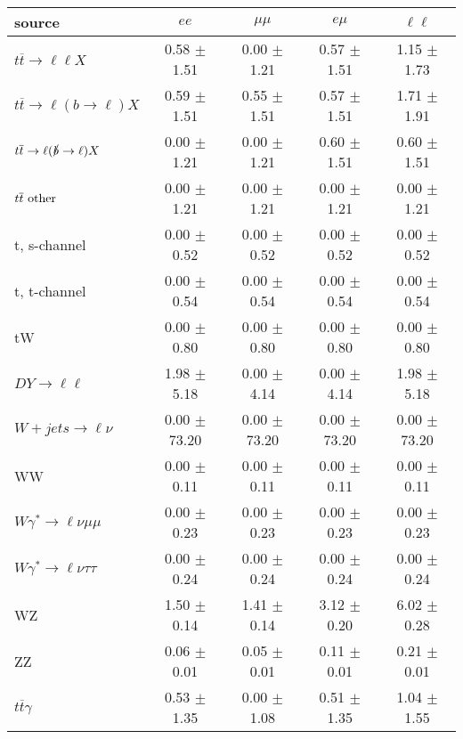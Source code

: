 \begin{tabular}{l|cccc} \hline\hline
source & $ee$ & $\mu\mu$ & $e\mu$ & $\ell\ell $ \\
\hline
$t\overline{t} \rightarrow \ell \ell X$ &  0.58 $\pm$  1.51 &  0.00 $\pm$  1.21 &  0.57 $\pm$  1.51 &  1.15 $\pm$  1.73 \\
$t\overline{t} \rightarrow \ell (b \rightarrow \ell) X$ &  0.59 $\pm$  1.51 &  0.55 $\pm$  1.51 &  0.57 $\pm$  1.51 &  1.71 $\pm$  1.91 \\
$t\overline{t} \rightarrow \ell (\slashed b \rightarrow \ell) X$ &  0.00 $\pm$  1.21 &  0.00 $\pm$  1.21 &  0.60 $\pm$  1.51 &  0.60 $\pm$  1.51 \\
        $t\overline{t}\ \rm{other}$ &  0.00 $\pm$  1.21 &  0.00 $\pm$  1.21 &  0.00 $\pm$  1.21 &  0.00 $\pm$  1.21 \\
\hline
                       t, s-channel &  0.00 $\pm$  0.52 &  0.00 $\pm$  0.52 &  0.00 $\pm$  0.52 &  0.00 $\pm$  0.52 \\
                       t, t-channel &  0.00 $\pm$  0.54 &  0.00 $\pm$  0.54 &  0.00 $\pm$  0.54 &  0.00 $\pm$  0.54 \\
                                 tW &  0.00 $\pm$  0.80 &  0.00 $\pm$  0.80 &  0.00 $\pm$  0.80 &  0.00 $\pm$  0.80 \\
\hline
         $DY \rightarrow \ell \ell$ &  1.98 $\pm$  5.18 &  0.00 $\pm$  4.14 &  0.00 $\pm$  4.14 &  1.98 $\pm$  5.18 \\
      $W+jets \rightarrow \ell \nu$ &  0.00 $\pm$ 73.20 &  0.00 $\pm$ 73.20 &  0.00 $\pm$ 73.20 &  0.00 $\pm$ 73.20 \\
                                 WW &  0.00 $\pm$  0.11 &  0.00 $\pm$  0.11 &  0.00 $\pm$  0.11 &  0.00 $\pm$  0.11 \\
\hline
$W\gamma^{*} \rightarrow \ell \nu \mu\mu$ &  0.00 $\pm$  0.23 &  0.00 $\pm$  0.23 &  0.00 $\pm$  0.23 &  0.00 $\pm$  0.23 \\
$W\gamma^{*} \rightarrow \ell \nu \tau\tau$ &  0.00 $\pm$  0.24 &  0.00 $\pm$  0.24 &  0.00 $\pm$  0.24 &  0.00 $\pm$  0.24 \\
                                 WZ &  1.50 $\pm$  0.14 &  1.41 $\pm$  0.14 &  3.12 $\pm$  0.20 &  6.02 $\pm$  0.28 \\
                                 ZZ &  0.06 $\pm$  0.01 &  0.05 $\pm$  0.01 &  0.11 $\pm$  0.01 &  0.21 $\pm$  0.01 \\
\hline
              $t\overline{t}\gamma$ &  0.53 $\pm$  1.35 &  0.00 $\pm$  1.08 &  0.51 $\pm$  1.35 &  1.04 $\pm$  1.55 \\

\end{tabular}

